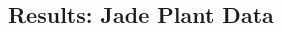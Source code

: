 \documentclass[a0,landscape]{a0poster}
\begin{document}
\begin{multicols}{4}

\subsection*{Results: Jade Plant Data \cite{Scharstein14}}


\end{multicols}
\end{document}
